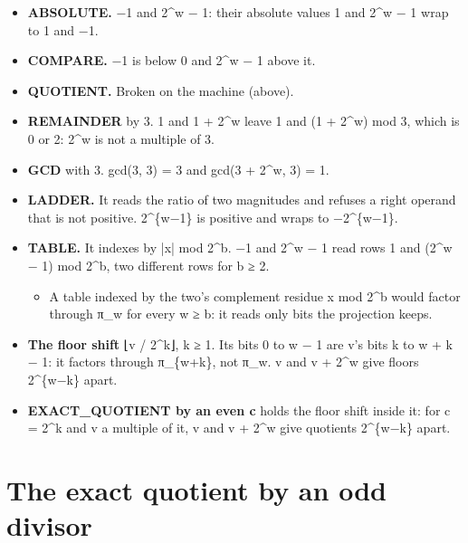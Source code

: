 \begin{itemize}
\item \textbf{ABSOLUTE.} −1 and 2\textasciicircum{}w − 1: their absolute values 1 and 2\textasciicircum{}w − 1 wrap to 1 and −1.
\item \textbf{COMPARE.} −1 is below 0 and 2\textasciicircum{}w − 1 above it.
\item \textbf{QUOTIENT.} Broken on the machine (above).
\item \textbf{REMAINDER} by 3. 1 and 1 + 2\textasciicircum{}w leave 1 and (1 + 2\textasciicircum{}w) mod 3, which is 0 or 2: 2\textasciicircum{}w is not a multiple of 3.
\item \textbf{GCD} with 3. gcd(3, 3) = 3 and gcd(3 + 2\textasciicircum{}w, 3) = 1.
\item \textbf{LADDER.} It reads the ratio of two magnitudes and refuses a right operand that is not positive. 2\textasciicircum{}\{w−1\} is positive and wraps to −2\textasciicircum{}\{w−1\}.
\item \textbf{TABLE.} It indexes by |x| mod 2\textasciicircum{}b. −1 and 2\textasciicircum{}w − 1 read rows 1 and (2\textasciicircum{}w − 1) mod 2\textasciicircum{}b, two different rows for b ≥ 2.

\begin{itemize}
\item A table indexed by the two's complement residue x mod 2\textasciicircum{}b would factor through π\_\allowbreak{}w for every w ≥ b: it reads only bits the projection keeps.
\end{itemize}
\item \textbf{The floor shift} ⌊v / 2\textasciicircum{}k⌋, k ≥ 1. Its bits 0 to w − 1 are v's bits k to w + k − 1: it factors through π\_\allowbreak{}\{w+k\}, not π\_\allowbreak{}w. v and v + 2\textasciicircum{}w give floors 2\textasciicircum{}\{w−k\} apart.
\item \textbf{EXACT\_\allowbreak{}QUOTIENT by an even c} holds the floor shift inside it: for c = 2\textasciicircum{}k and v a multiple of it, v and v + 2\textasciicircum{}w give quotients 2\textasciicircum{}\{w−k\} apart.
\end{itemize}

\section{\texorpdfstring{The exact quotient by an odd divisor}{The exact quotient by an odd divisor}}

